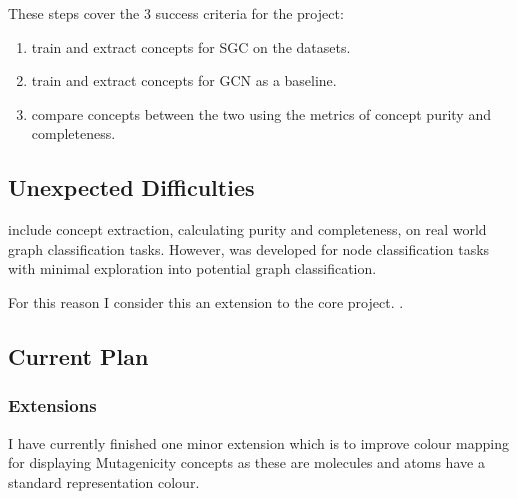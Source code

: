 These steps cover the 3 success criteria for the project:
\begin{enumerate}[nolistsep]
    \item train and extract concepts for SGC on the \cite{magister2021gcexplainer} datasets.
    \item train and extract concepts for GCN as a baseline.
    \item compare concepts between the two using the metrics of concept purity and completeness.
\end{enumerate}

\subsection{Unexpected Difficulties}

\cite{magister2021gcexplainer} include concept extraction, calculating purity and completeness, on real world graph classification tasks. However, \cite[SGC]{wu2019simplifying} was developed for node classification tasks with minimal exploration into potential graph classification. 

For this reason I consider this an extension to the core project. .

\subsection{Current Plan}

\subsubsection{Extensions}

I have currently finished one minor extension which is to improve colour mapping for displaying Mutagenicity concepts as these are molecules and atoms have a standard representation colour.

